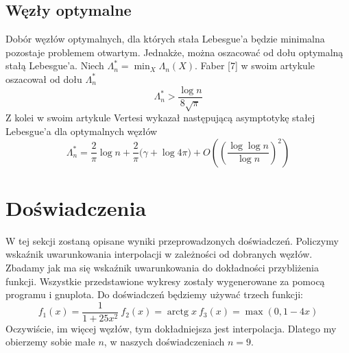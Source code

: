 \documentclass{article}
\DeclareMathOperator{\arctg}{arctg}
\begin{document}
\subsection{Węzły optymalne}
Dobór węzłów optymalnych, dla których stała Lebesgue'a będzie minimalna pozostaje problemem otwartym. Jednakże, można oszacować od dołu optymalną stałą Lebesgue'a. Niech $\Lambda_n^* = \min_{X} \Lambda_n(X)$.
Faber [7] w swoim artykule oszacował od dołu $\Lambda_n^*$
\begin{equation*}
\Lambda_n^* > \frac{\log n}{8 \sqrt{\pi}}
\end{equation*}
Z kolei w swoim artykule Vertesi wykazał następującą asymptotykę stałej Lebesgue'a dla optymalnych węzłów
\begin{equation*}
\Lambda_n^* = \frac{2}{\pi} \log n + \frac{2}{\pi} \Big( \gamma + \log {4}{\pi}\Big) + O\left(\left(\frac{\log \log n}{\log n}\right)^2\right)
\end{equation*}


\section{Doświadczenia}
W tej sekcji zostaną opisane wyniki przeprowadzonych doświadczeń. Policzymy wskaźnik uwarunkowania interpolacji w zależności od dobranych węzłów. Zbadamy jak ma się wskaźnik uwarunkowania do dokładności przybliżenia funkcji. Wszystkie przedstawione wykresy zostały wygenerowane za pomocą programu i gnuplota.
Do doświadczeń będziemy używać trzech funkcji:
\begin{equation*}
f_1(x) = \frac{1}{1 + 25x^2} \ f_2(x) = \arctg x \ f_3(x) = \max(0, 1 - 4x)
\end{equation*}
Oczywiście, im więcej węzłów, tym dokładniejsza jest interpolacja. Dlatego my obierzemy sobie małe $n$, w naszych doświadczeniach $n = 9$.
\end{document}
